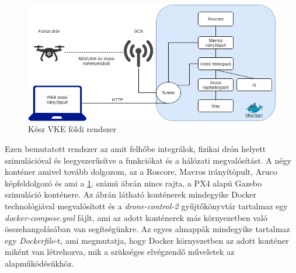 \begin{figure}
	\centering
	\includegraphics[width=\linewidth]{figures/vke_drone.png}
	\caption{Kész VKE földi rendszer}
	\label{fig:vke}
\end{figure}

\noindent
Ezen bemutatott rendszer az amit felhőbe integrálok, fizikai drón helyett szimulációval és leegyszerűsítve a funkciókat és a hálózati megvalósítást. A négy konténer amivel tovább dolgozom, az a Roscore, Mavros irányítópult, Aruco képfeldolgozó és ami a \ref{fig:vke}. számú ábrán nincs rajta, a PX4 alapú Gazebo szimuláció konténere. Az ábrán látható konténerek mindegyike Docker technológiával megvalósított és a \emph{drone-control-2} gyűjtőkönyvtár tartalmaz egy \emph{docker-compose.yml} fájlt, ami az adott konténerek más környezetben való összehangolásában van segítségünkre. Az egyes almappák mindegyike tartalmaz egy \emph{Dockerfile}-t, ami megmutatja, hogy Docker környezetben az adott konténer miként van létrehozva, mik a szükséges elvégzendő műveletek az alapműködésükhöz.